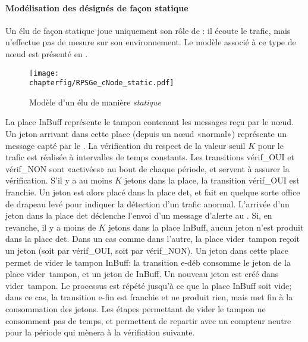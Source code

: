             \paragraph{Modélisation des \cns désignés de façon statique}
Un \cn élu de façon statique joue uniquement son rôle de \cn: il écoute le trafic, mais n'effectue pas de mesure sur son environnement.
Le modèle \rpsge associé à ce type de nœud est présenté en .
\begin{figure}[ht]
    \centering
    \texttt{[image: \\chapterfig/RPSGe\_cNode\_static.pdf]}
    \caption{Modèle \rpsge d'un \cn élu de manière \emph{statique}}\label{sa:fig:cnodegspn1}
\end{figure}
La place \textsf{InBuff} représente le tampon contenant les messages reçu par le nœud.
Un jeton arrivant dans cette place (depuis un nœud «normal») représente un message capté par le \cn.
La vérification du respect de la valeur seuil $K$ pour le trafic est réalisée à intervalles de temps constants.
Les transitions \textsf{vérif\_OUI} et \textsf{vérif\_NON} sont «activées» au bout de chaque période, et servent à assurer la vérification.
S'il y a au moins $K$ jetons dans la place, la transition \textsf{vérif\_OUI} est franchie.
Un jeton est alors placé dans la place \textsf{det}, et fait en quelque sorte office de drapeau levé pour indiquer la détection d'un trafic anormal.
L'arrivée d'un jeton dans la place \textsf{det} déclenche l'envoi d'un message d'alerte au \ch.
Si, en revanche, il y a moins de $K$ jetons dans la place \textsf{InBuff}, aucun jeton n'est produit dans la place \textsf{det}.
Dans un cas comme dans l'autre, la place \textsf{vider~tampon} reçoit un jeton (soit par \textsf{vérif\_OUI}, soit par \textsf{vérif\_NON}).
Un jeton dans cette place permet de vider le tampon \textsf{InBuff}: la transition \textsf{e-déb} consomme le jeton de la place \textsf{vider~tampon}, et un jeton de \textsf{InBuff}.
Un nouveau jeton est créé dans \textsf{vider~tampon}.
Le processus est répété jusqu'à ce que la place \textsf{InBuff} soit vide; dans ce cas, la transition \textsf{e-fin} est franchie et ne produit rien, mais met fin à la consommation des jetons.
Les étapes permettant de vider le tampon ne consomment pas de temps, et permettent de repartir avec un compteur neutre pour la période qui mènera à la vérifiation suivante.

